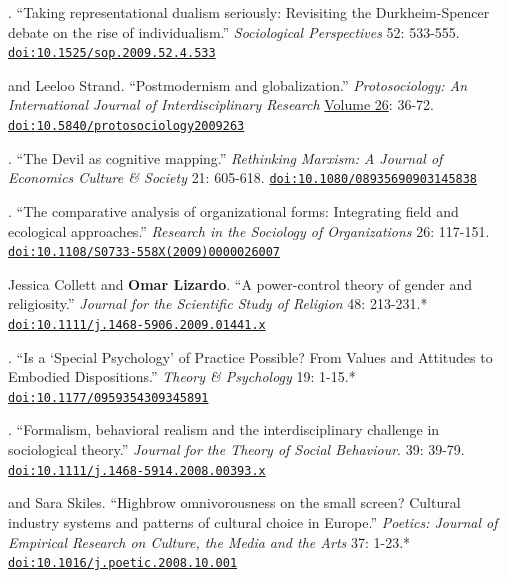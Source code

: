 
. ``Taking representational dualism seriously: Revisiting the Durkheim-Spencer debate on the rise of individualism.''  {\em Sociological Perspectives} 52: 533-555. \href{https://doi.org/10.1525/sop.2009.52.4.533}{\nolinkurl{doi:10.1525/sop.2009.52.4.533}}

 and Leeloo Strand. ``Postmodernism and globalization.'' {\em Protosociology: An International Journal of Interdisciplinary Research} \href{http://www.protosociology.de/Download/ProtoSociology-Vol26-S.pdf}{Volume 26}: 36-72. \href{https://doi.org/10.5840/protosociology2009263}{\nolinkurl{doi:10.5840/protosociology2009263}}

. ``The Devil as cognitive mapping.''  {\em Rethinking Marxism: A Journal of Economics Culture \& Society } 21: 605-618. \href{https://doi.org/10.1080/08935690903145838}{\nolinkurl{doi:10.1080/08935690903145838}}

. ``The comparative analysis of organizational forms:  Integrating field and ecological approaches.''  {\em Research in the Sociology of Organizations} 26: 117-151. \href{https://doi.org/10.1108/S0733-558X(2009)0000026007}{\nolinkurl{doi:10.1108/S0733-558X(2009)0000026007}}

\ind Jessica Collett and {\bf Omar Lizardo}. ``A power-control theory of gender and religiosity.'' {\em Journal for the Scientific Study of Religion} 48: 213-231.\textcolor{uclagold}{*} \href{https://doi.org/10.1111/j.1468-5906.2009.01441.x}{\nolinkurl{doi:10.1111/j.1468-5906.2009.01441.x}}

. ``Is a `Special Psychology' of Practice Possible? From Values and Attitudes to Embodied Dispositions.'' \emph{Theory \& Psychology} 19: 1-15.\textcolor{uclablue}{*} \href{https://doi.org/10.1177/0959354309345891}{\nolinkurl{doi:10.1177/0959354309345891}}

. ``Formalism, behavioral realism and the interdisciplinary challenge in sociological theory.'' {\em Journal for the Theory of Social Behaviour}.  39: 39-79. \href{https://doi.org/10.1111/j.1468-5914.2008.00393.x}{\nolinkurl{doi:10.1111/j.1468-5914.2008.00393.x}}

 and Sara Skiles. ``Highbrow omnivorousness on the small screen? Cultural industry systems and patterns of cultural choice in Europe.'' {\em Poetics: Journal of Empirical Research on Culture, the Media and the Arts} 37: 1-23.\textcolor{uclablue}{*} \href{https://doi.org/10.1016/j.poetic.2008.10.001}{\nolinkurl{doi:10.1016/j.poetic.2008.10.001}}
